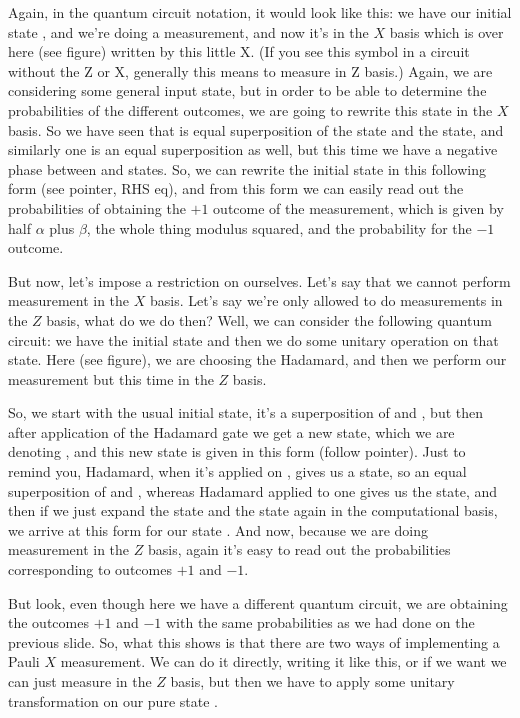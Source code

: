 Again, in the quantum circuit notation, it would look like this: we have our initial state \ket{\psi}, and we're doing a measurement, and now it's in the $X$ basis which is over here (see figure) written by this little X.  (If you see this symbol in a circuit without the Z or X, generally this means to measure in Z basis.) Again, we are considering some general input state, but in order to be able to determine the probabilities of the different outcomes, we are going to rewrite this state in the $X$ basis. So we have seen that  is equal superposition of the \ket{+} state and the \ket{-} state, and similarly one is an equal superposition as well, but this time we have a negative phase between \ket{+} and \ket{-} states. So, we can rewrite the initial state in this following form (see pointer, RHS eq), and from this form we can easily read out the probabilities of obtaining the  $+1$ outcome of the measurement, which is given by half $\alpha$ plus $\beta$, the whole thing modulus squared, and the probability for the  $-1$ outcome.

But now, let's impose a restriction on ourselves. Let's say that we cannot perform measurement in the $X$ basis. Let's say we're only allowed to do measurements in the $Z$ basis, what do we do then? Well, we can consider the following quantum circuit: we have the initial state and then we do some unitary operation on that state. Here (see figure), we are choosing the Hadamard, and then we perform our measurement but this time in the $Z$ basis.

So, we start with the usual initial state, it's a superposition of  and , but then after application of the Hadamard gate we get a new state, which we are denoting , and this new state is given in this form (follow pointer). Just to remind you, Hadamard, when it's applied on , gives us a \ket{+} state, so an equal superposition of  and , whereas Hadamard applied to one gives us the \ket{-} state, and then if we just expand the \ket{+} state and the \ket{-} state again in the computational basis, we arrive at this form for our state \ket{\Psi^+}. And now, because we are doing measurement in the $Z$ basis, again it's easy to read out the probabilities corresponding to outcomes $+1$ and $-1$.

But look, even though here we have a different quantum circuit, we are obtaining the outcomes $+1$ and $-1$ with the same probabilities as we had done on the previous slide. So, what this shows is that there are two ways of implementing a Pauli $X$ measurement. We can do it directly, writing it like this, or if we want we can just measure in the $Z$ basis, but then we have to apply some unitary transformation on our pure state \ket{\psi}.

